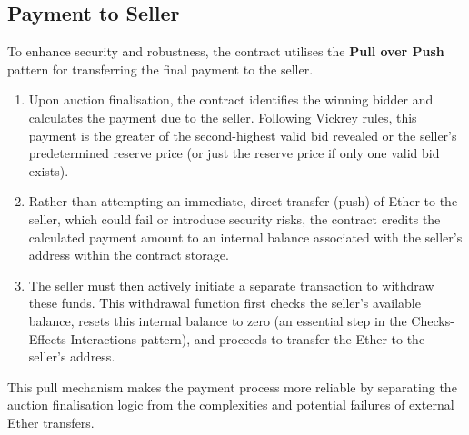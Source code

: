 \documentclass[11pt, a4paper]{article}
\begin{document}
\subsection{Payment to Seller}
To enhance security and robustness, the contract utilises the \textbf{Pull over Push} pattern for transferring the final payment to the seller.
\begin{enumerate}
    \item Upon auction finalisation, the contract identifies the winning bidder and calculates the payment due to the seller. Following Vickrey rules, this payment is the greater of the second-highest valid bid revealed or the seller's predetermined reserve price (or just the reserve price if only one valid bid exists).
    \item Rather than attempting an immediate, direct transfer (push) of Ether to the seller, which could fail or introduce security risks, the contract credits the calculated payment amount to an internal balance associated with the seller's address within the contract storage.
    \item The seller must then actively initiate a separate transaction to withdraw these funds. This withdrawal function first checks the seller's available balance, resets this internal balance to zero (an essential step in the Checks-Effects-Interactions pattern), and proceeds to transfer the Ether to the seller's address.
\end{enumerate}
This pull mechanism makes the payment process more reliable by separating the auction finalisation logic from the complexities and potential failures of external Ether transfers.
\end{document}

